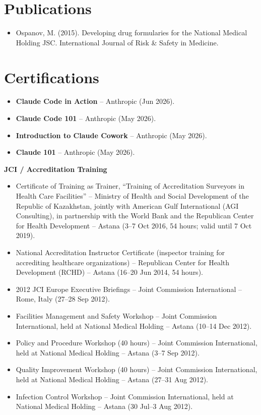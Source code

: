 \documentclass[11pt,a4paper,sans]{moderncv}
\begin{document}
\section{Publications}
\vspace{1pt}
\begin{itemize}
\item Ospanov, M. (2015). Developing drug formularies for the National Medical Holding JSC. International Journal of Risk \& Safety in Medicine.
\end{itemize}


\section{Certifications}
\vspace{1pt}
\begin{itemize}
\item{\textbf{Claude Code in Action} -- Anthropic (Jun 2026).}
\item{\textbf{Claude Code 101} -- Anthropic (May 2026).}
\item{\textbf{Introduction to Claude Cowork} -- Anthropic (May 2026).}
\item{\textbf{Claude 101} -- Anthropic (May 2026).}
\end{itemize}

\vspace{2pt}
\textbf{JCI / Accreditation Training}
\begin{itemize}
\item{Certificate of Training as Trainer, ``Training of Accreditation Surveyors in Health Care Facilities'' -- Ministry of Health and Social Development of the Republic of Kazakhstan, jointly with American Gulf International (AGI Consulting), in partnership with the World Bank and the Republican Center for Health Development -- Astana (3--7 Oct 2016, 54 hours; valid until 7 Oct 2019).}
\item{National Accreditation Instructor Certificate (inspector training for accrediting healthcare organizations) -- Republican Center for Health Development (RCHD) -- Astana (16--20 Jun 2014, 54 hours).}
\item{2012 JCI Europe Executive Briefings -- Joint Commission International -- Rome, Italy (27--28 Sep 2012).}
\item{Facilities Management and Safety Workshop -- Joint Commission International, held at National Medical Holding -- Astana (10--14 Dec 2012).}
\item{Policy and Procedure Workshop (40 hours) -- Joint Commission International, held at National Medical Holding -- Astana (3--7 Sep 2012).}
\item{Quality Improvement Workshop (40 hours) -- Joint Commission International, held at National Medical Holding -- Astana (27--31 Aug 2012).}
\item{Infection Control Workshop -- Joint Commission International, held at National Medical Holding -- Astana (30 Jul--3 Aug 2012).}
\end{itemize}
\end{document}
